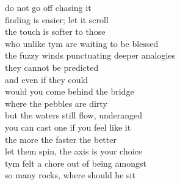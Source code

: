 do not go off chasing it\\
finding is easier; let it scroll\\
the touch is softer to those\\
who unlike tym are waiting to be blessed\\
the fuzzy winds punctuating deeper analogies\\

they cannot be predicted\\
and even if they could\\
would you come behind the bridge\\
where the pebbles are dirty\\
but the waters still flow, underanged\\

you can cast one if you feel like it\\
the more the faster the better\\
let them spin, the axis is your choice\\
tym felt a chore out of being amongst\\
so many rocks, where should he sit

